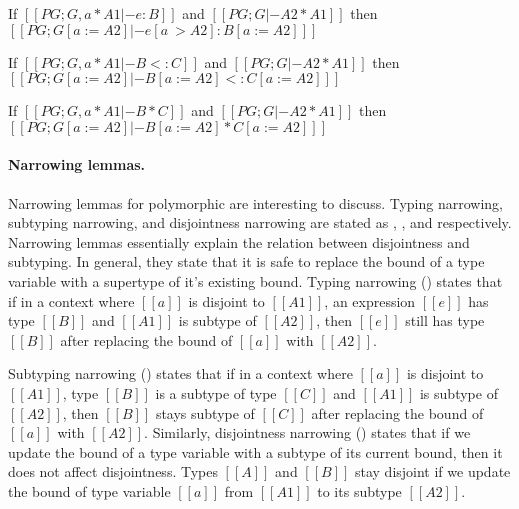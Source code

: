 \begin{lemma}\label{lemma:typ:rev:poly:subst}
  If $[[PG ; G , a * A1 |- e : B]]$ and $[[PG ; G |- A2 * A1]]$
  then $[[PG ; G [ a := A2 ] |-  e [ a ~> A2 ] : B [ a := A2 ] ]]$
\end{lemma}

\begin{lemma}\label{lemma:sub:rev:poly:subst}
  If $[[PG ; G , a * A1 |- B <: C]]$ and $[[PG ; G |- A2 * A1]]$
  then $[[PG ; G [ a := A2 ] |-  B [ a := A2 ] <: C [ a := A2 ] ]]$
\end{lemma}

\begin{lemma}\label{lemma:disj:rev:poly:subst}
  If $[[PG ; G , a * A1 |- B * C]]$ and $[[PG ; G |- A2 * A1]]$
  then $[[PG ; G [ a := A2 ] |-  B [ a := A2 ] * C [ a := A2 ] ]]$
\end{lemma}


\paragraph{Narrowing lemmas.}
Narrowing lemmas for polymorphic \name are interesting to discuss.
Typing narrowing, subtyping narrowing, and disjointness narrowing
are stated as , 
, and 
 respectively.
Narrowing lemmas essentially explain the relation between
disjointness and subtyping. In general, they state that it is
safe to replace the bound of a type variable with a supertype of
it's existing bound.
Typing narrowing () states that
if in a context
where $[[a]]$ is disjoint to $[[A1]]$,
an expression $[[e]]$ has type $[[B]]$ and
$[[A1]]$ is subtype of $[[A2]]$, then
$[[e]]$ still has type $[[B]]$ after replacing
the bound of $[[a]]$ with $[[A2]]$. 

Subtyping narrowing () states that
if in a context
where $[[a]]$ is disjoint to $[[A1]]$,
type $[[B]]$ is a subtype of type $[[C]]$ and
$[[A1]]$ is subtype of $[[A2]]$, then
$[[B]]$ stays subtype of $[[C]]$ after replacing
the bound of $[[a]]$ with $[[A2]]$.
Similarly, disjointness narrowing 
()
states that if we update the bound of a type variable with a
subtype of its current bound, then it does not affect disjointness.
Types $[[A]]$ and $[[B]]$ stay disjoint if we update the bound of
type variable $[[a]]$ from $[[A1]]$ to its subtype $[[A2]]$.


